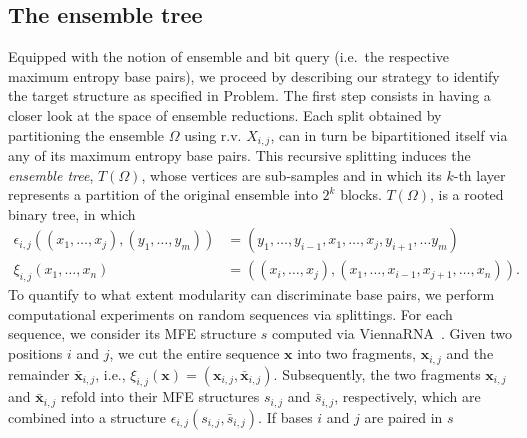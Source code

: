 \documentclass[preprint,authoryear]{elsarticle}
\begin{document}
\subsection{The ensemble tree}
Equipped with the notion of ensemble and bit query (i.e.~the respective maximum entropy base pairs),
we proceed by describing our strategy to identify the target structure as specified in Problem.
The first step consists in having a closer look at the space of ensemble reductions.
Each split obtained by partitioning the ensemble $\Omega$ using r.v. $X_{i,j}$, can in turn be
bipartitioned itself via any of its maximum entropy base pairs. This recursive splitting induces the
{\it ensemble  tree}, $T(\Omega)$, whose vertices are sub-samples and in which its $k$-th layer represents
a partition of the original ensemble into $2^k$ blocks. $T(\Omega)$, is a rooted binary tree, in which
\begin{align*}
\epsilon_{i,j}((x_1,\dots, x_j),(y_1,\dots,y_m)) & =  (y_1,\dots,y_{i-1},x_1,\dots,x_j,y_{i+1},\dots y_m)\\
\xi_{i,j}(x_1,\dots,x_{n}) & =  ((x_i,\dots,x_{j}),(x_1,\dots,x_{i-1},x_{j+1},\dots,x_{n})).
\end{align*}
To quantify to what extent modularity can discriminate base pairs, %
we perform computational experiments on random sequences via splittings. For each sequence, we consider
its MFE structure $s$ computed via \textsf{ViennaRNA}~\citep{Lorenz:11}.
Given two positions $i$ and $j$, we cut the entire sequence $\mathbf{x}$  into two fragments,
$\mathbf{x}_{i,j}$ and the remainder  $\bar{\mathbf{x}}_{i,j}$, 
	i.e., $ \xi_{i,j}(\mathbf{x})=(\mathbf{x}_{i,j},\bar{\mathbf{x}}_{i,j})$.
Subsequently, the two fragments $\mathbf{x}_{i,j}$ and  $\bar{\mathbf{x}}_{i,j}$ refold
into their MFE structures $s_{i,j}$  and   $\bar{s}_{i,j}$, respectively,
which are combined into a structure $\epsilon_{i,j}(s_{i,j}, \bar{s}_{i,j})$.
If bases $i$ and $j$ are paired in $s$
\end{document}
